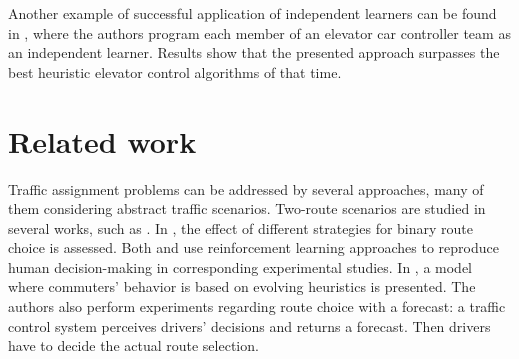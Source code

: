 \documentclass{RITA}
\begin{document}
Another example of successful application of independent learners can be found in \cite{Crites&Barto1998}, where the authors program each member of an elevator car controller team as an independent learner. Results show that the presented approach surpasses the best heuristic elevator control algorithms of that time.




\section{Related work}
\label{sec:related}




Traffic assignment problems can be addressed by several approaches, many of them considering abstract traffic scenarios. Two-route scenarios are studied in several works, such as \cite{Bazzan+2000icmas,Ben-Elia&Shiftan2010,Chmura&Pitz2007,Kluegl&Bazzan2004jasss}. In \cite{Bazzan+2000icmas}, the effect of different strategies for binary route choice is assessed. %
Both \cite{Ben-Elia&Shiftan2010} and \cite{Chmura&Pitz2007} use reinforcement learning approaches to reproduce human decision-making in corresponding experimental studies. %
In \cite{Bazzan+2000icmas}, a model where commuters' behavior is based on evolving heuristics is presented. The authors also perform experiments regarding route choice with a forecast: a traffic control system perceives drivers' decisions and returns a forecast. Then drivers have to decide the actual route selection. %
\end{document}
